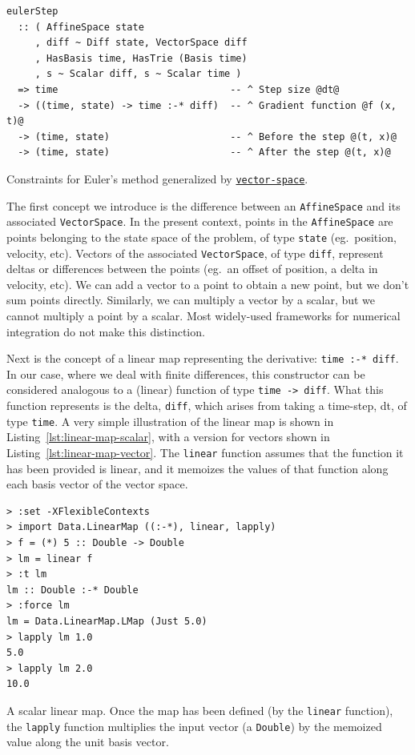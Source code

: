 \documentclass[12pt,openany]{book}
\newcommand{\code}[1]{\texttt{#1}}      %
\newcommand{\hspackage}[1]{\href{http://hackage.haskell.org/package/#1}{\texttt{#1}}}
\begin{document}
\begin{listing}[htbp]
\begin{verbatim}
eulerStep
  :: ( AffineSpace state
     , diff ~ Diff state, VectorSpace diff
     , HasBasis time, HasTrie (Basis time)
     , s ~ Scalar diff, s ~ Scalar time )
  => time                              -- ^ Step size @dt@
  -> ((time, state) -> time :-* diff)  -- ^ Gradient function @f (x, t)@
  -> (time, state)                     -- ^ Before the step @(t, x)@
  -> (time, state)                     -- ^ After the step @(t, x)@
\end{verbatim}
\caption{Constraints for Euler's method generalized by \hspackage{vector-space}.}
\label{lst:euler-vector-space}
\end{listing}

The first concept we introduce is the difference between an \code{AffineSpace} and its associated \code{VectorSpace}. In the present context, points in the \code{AffineSpace} are points belonging to the state space of the problem, of type \code{state} (eg.~position, velocity, etc). Vectors of the associated \code{VectorSpace}, of type \code{diff}, represent deltas or differences between the points (eg.~an offset of position, a delta in velocity, etc). We can add a vector to a point to obtain a new point, but we don't sum points directly. Similarly, we can multiply a vector by a scalar, but we cannot multiply a point by a scalar. Most widely-used frameworks for numerical integration do not make this distinction.

Next is the concept of a linear map representing the derivative: \code{time :-* diff}. In our case, where we deal with finite differences, this constructor can be considered analogous to a (linear) function of type \code{time -> diff}. What this function represents is the delta, \code{diff}, which arises from taking a time-step, \gls{dt}, of type \code{time}. A very simple illustration of the linear map is shown in Listing~\ref{lst:linear-map-scalar}, with a version for vectors shown in Listing~\ref{lst:linear-map-vector}. The \code{linear} function assumes that the function it has been provided is linear, and it memoizes the values of that function along each basis vector of the vector space.

\begin{listing}[htbp]
\begin{verbatim}
> :set -XFlexibleContexts
> import Data.LinearMap ((:-*), linear, lapply)
> f = (*) 5 :: Double -> Double
> lm = linear f
> :t lm
lm :: Double :-* Double
> :force lm
lm = Data.LinearMap.LMap (Just 5.0)
> lapply lm 1.0
5.0
> lapply lm 2.0
10.0
\end{verbatim}
\caption{A scalar linear map. Once the map has been defined (by the \code{linear} function), the \code{lapply} function multiplies the input vector (a \code{Double}) by the memoized value along the unit basis vector.}
\label{lst:linear-map-scalar}
\end{listing}
\end{document}
